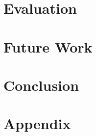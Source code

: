 \documentclass[
	11pt, 
	a4paper, 
	twoside, 
	openright, 
	titlepage=firstiscover, 
	numbers=noenddot, 
	BCOR=12mm,
	headsepline,
	footsepline,
	toc=listof,
	toc=bibliography
	]{scrbook}
\let\cleardoublepage\clearpage
\begin{document}

	
	
	 
	\tableofcontents
	

	
	
	
	
	
	
	\chapter{Evaluation}
	
	
	\chapter{Future Work}
	
	
	\chapter{Conclusion}
	
	
	
\cleardoublepage
{}
	
	\appendix
	
	\chapter{Appendix}
	
	
	
	
	
	\renewcommand{\listtheoremname}{List of Definitions}
	\listoftheorems[ignoreall,show={definition}]
	\listoffigures
	\listoftables
	\renewcommand{\lstlistlistingname}{List of \lstlistingname s}
	\lstlistoflistings	
	\renewcommand{\listtheoremname}{List of Formulas}
	\listoftheorems[ignoreall,show={formula}]
	\printbibliography %
\end{document}
